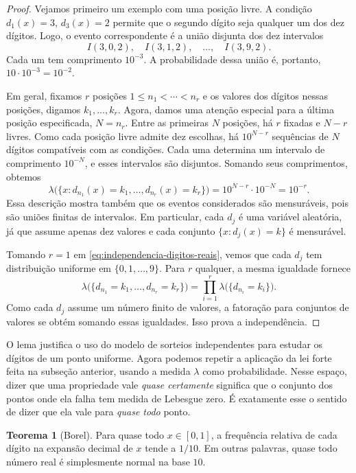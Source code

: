 \documentclass[12pt,portuguese]{article}
\theoremstyle{definition}
\newtheorem{theorem}{Teorema}
\theoremstyle{plainexercise}
\theoremstyle{starredexercise}
\theoremstyle{definition}
\begin{document}
\begin{proof}
Vejamos primeiro um exemplo com uma posição livre. A condição
$d_1(x)=3$, $d_3(x)=2$ permite que o segundo dígito seja qualquer um dos dez
dígitos. Logo, o evento correspondente é a união disjunta dos dez intervalos
\[
I(3,0,2),\quad I(3,1,2),\quad\ldots,\quad I(3,9,2).
\]
Cada um tem comprimento $10^{-3}$. A probabilidade dessa união é, portanto,
$10\cdot10^{-3}=10^{-2}$.

Em geral, fixamos $r$ posições $1\leqslant n_1<\cdots<n_r$ e os valores dos
dígitos nessas posições, digamos $k_1,\ldots,k_r$. Agora, damos uma atenção especial para a última
posição especificada, $N=n_r$. Entre as primeiras $N$ posições, há $r$
fixadas e $N-r$ livres. Como cada posição livre admite dez escolhas, há
$10^{N-r}$ sequências de $N$ dígitos compatíveis com as condições. Cada uma
determina um intervalo de comprimento $10^{-N}$, e esses intervalos são
disjuntos. Somando seus comprimentos, obtemos
\begin{equation}\label{eq:independencia-digitos-reais}
\lambda\bigl(\{x:d_{n_1}(x)=k_1,\ldots,d_{n_r}(x)=k_r\}\bigr)
=10^{N-r}\cdot10^{-N}=10^{-r}.
\end{equation}
Essa descrição mostra também que os eventos considerados são mensuráveis,
pois são uniões finitas de intervalos. Em particular, cada $d_j$ é uma
variável aleatória, já que assume apenas dez valores e cada conjunto
$\{x:d_j(x)=k\}$ é mensurável.

Tomando $r=1$ em \eqref{eq:independencia-digitos-reais}, vemos que cada
$d_j$ tem distribuição uniforme em $\{0,1,\ldots,9\}$. Para $r$ qualquer, a
mesma igualdade fornece
\[
\lambda\bigl(\{d_{n_1}=k_1,\ldots,d_{n_r}=k_r\}\bigr)
=\prod_{i=1}^{r}\lambda\bigl(\{d_{n_i}=k_i\}\bigr).
\]
Como cada $d_j$ assume um número finito de valores, a fatoração para conjuntos
de valores se obtém somando essas igualdades. Isso prova a independência.
\end{proof}

O lema justifica o uso do modelo de sorteios independentes para estudar os
dígitos de um ponto uniforme. Agora podemos repetir a aplicação da lei forte
feita na subseção anterior, usando a medida $\lambda$ como probabilidade.
Nesse espaço, dizer que uma propriedade vale \emph{quase certamente} significa
que o conjunto dos pontos onde ela falha tem medida de Lebesgue zero. É
exatamente esse o sentido de dizer que ela vale para \emph{quase todo} ponto.

\begin{theorem}[Borel]\label{thm:borel-reais}
Para quase todo $x\in[0,1]$, a frequência relativa de cada dígito na expansão
decimal de $x$ tende a $1/10$. Em outras palavras, quase todo número real é
simplesmente normal na base $10$.
\end{theorem}
\end{document}

